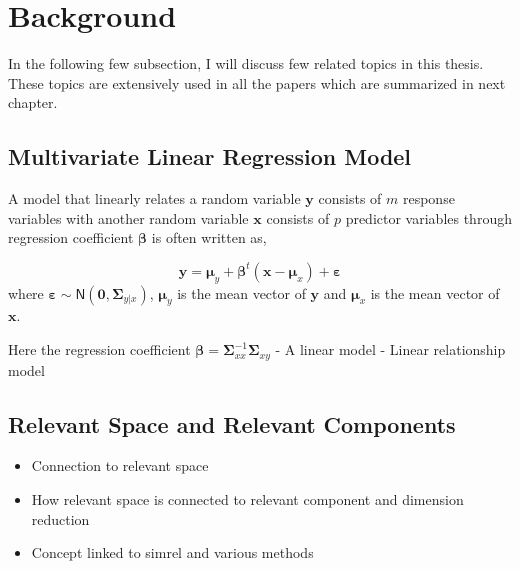 \documentclass[11pt,twoside,openright,titlepage,
  headinclude,footinclude,BCOR=5mm,
  numbers=noenddot,cleardoublepage=empty,
  tablecaptionabove, dottedtoc,
  bibliography=totoc]{scrreprt}
\providecommand{\tightlist}{%
  \setlength{\itemsep}{0pt}\setlength{\parskip}{0pt}}
\begin{document}
\hypertarget{background}{%
\section{Background}\label{background}}

In the following few subsection, I will discuss few related topics in this thesis. These topics are extensively used in all the papers which are summarized in next chapter.

\hypertarget{multivariate-linear-regression-model}{%
\subsection{Multivariate Linear Regression Model}\label{multivariate-linear-regression-model}}

A model that linearly relates a random variable \(\mathbold{y}\) consists of \(m\) response variables with another random variable \(\mathbold{x}\) consists of \(p\) predictor variables through regression coefficient \(\boldsymbol{\beta}\) is often written as,

\begin{equation}
\mathbold{y} = \boldsymbol{\mu}_y + \boldsymbol{\beta}^t\left(\mathbold{x} - \boldsymbol{\mu}_x\right) + \boldsymbol{\varepsilon}
\end{equation}
where \(\boldsymbol{\varepsilon} \sim \textsf{N}\left(\mathbold{0}, \boldsymbol{\Sigma}_{y|x}\right)\), \(\boldsymbol{\mu}_y\) is the mean vector of \(\mathbold{y}\) and \(\boldsymbol{\mu}_x\) is the mean vector of \(\mathbold{x}\).

Here the regression coefficient \(\boldsymbol{\beta} = \boldsymbol{\Sigma}_{xx}^{-1}\boldsymbol{\Sigma}_{xy}\)
- A linear model
- Linear relationship model

\hypertarget{relevant-space-and-relevant-components}{%
\subsection{Relevant Space and Relevant Components}\label{relevant-space-and-relevant-components}}

\begin{itemize}
\tightlist
\item
  Connection to relevant space
\item
  How relevant space is connected to relevant component and dimension reduction
\item
  Concept linked to simrel and various methods
\end{itemize}
\end{document}
